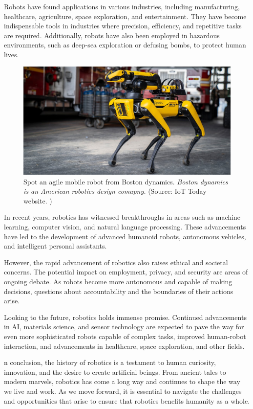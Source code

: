 Robots have found applications in various industries, including manufacturing, healthcare, agriculture, space exploration, and entertainment. They have become indispensable tools in industries where precision, efficiency, and repetitive tasks are required. Additionally, robots have also been employed in hazardous environments, such as deep-sea exploration or defusing bombs, to protect human lives.
\begin{figure}[H]
    \centering
    \includegraphics[scale=.5]{images/boston-dynamics-spot}
    \caption[Boston dynamics robot (spot)]{Spot an agile mobile robot from Boston dynamics. \textit{Boston dynamics is an American robotics design comapny.} (Source: IoT Today website. \cite{iotworldtoday})}
\end{figure}

In recent years, robotics has witnessed breakthroughs in areas such as machine learning, computer vision, and natural language processing. These advancements have led to the development of advanced humanoid robots, autonomous vehicles, and intelligent personal assistants.


However, the rapid advancement of robotics also raises ethical and societal concerns. The potential impact on employment, privacy, and security are areas of ongoing debate. As robots become more autonomous and capable of making decisions, questions about accountability and the boundaries of their actions arise.

Looking to the future, robotics holds immense promise. Continued advancements in AI, materials science, and sensor technology are expected to pave the way for even more sophisticated robots capable of complex tasks, improved human-robot interaction, and advancements in healthcare, space exploration, and other fields.

n conclusion, the history of robotics is a testament to human curiosity, innovation, and the desire to create artificial beings. From ancient tales to modern marvels, robotics has come a long way and continues to shape the way we live and work. As we move forward, it is essential to navigate the challenges and opportunities that arise to ensure that robotics benefits humanity as a whole.

